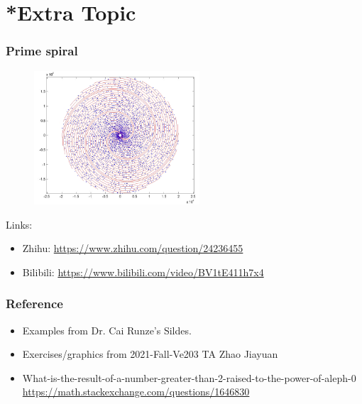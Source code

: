 \documentclass{beamer}
\begin{document}
\section{*Extra Topic}
\begin{frame}
    \frametitle{Prime spiral}
    \begin{figure}[htbp]
        \centering
        \includegraphics[width=0.55\textwidth]{spiral.png}
    \end{figure}
    Links:
    \begin{itemize}
        \item Zhihu: \url{https://www.zhihu.com/question/24236455}
        \item Bilibili: \url{https://www.bilibili.com/video/BV1tE411h7x4}
    \end{itemize}
\end{frame}
\begin{frame}
    \frametitle{Reference}
    \begin{itemize}
        \item Examples from Dr. Cai Runze's Sildes.
        \item Exercises/graphics from 2021-Fall-Ve203 TA Zhao Jiayuan
        \item What-is-the-result-of-a-number-greater-than-2-raised-to-the-power-of-aleph-0 
        \url{https://math.stackexchange.com/questions/1646830}
    \end{itemize}
\end{frame}
\end{document}
